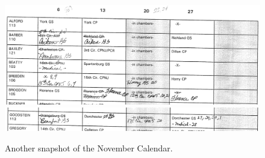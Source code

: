 \documentclass[11pt, oneside]{article}   	%
\theoremstyle{ModifiedStyle}
\begin{document}
\begin{figure}
	\centering
	\includegraphics[scale=0.42]{Figures/Fig3A}
	\includegraphics[scale=0.42]{Figures/Fig3B}
	\caption{Another snapshot of the November Calendar.}
	\label{Figure_Master_Calendar_3}
\end{figure}

\vspace{-3mm}
\end{document}
